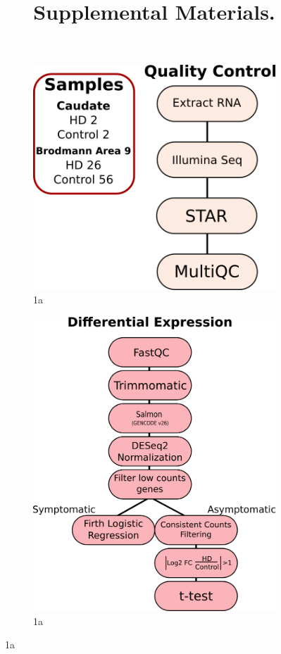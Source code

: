 \documentclass[fleqn,10pt,table]{wlscirep}
\title{Supplemental Materials.}
\begin{document}
\begin{figure}[ht]
\centering
\begin{subfigure}{0.30\textwidth}
\includegraphics[width=.8\linewidth]{quality_control.png}
\caption{1a}
\label{fig:sfig1a}
\end{subfigure}
\begin{subfigure}{0.30\textwidth}
\includegraphics[width=.8\linewidth]{differential_expression.png}
\caption{1a}
\label{fig:sfig1b}
\end{subfigure}

\end{figure}
\end{document}
